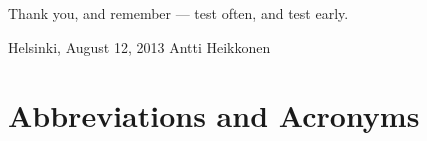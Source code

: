 \documentclass[12pt,a4paper,oneside,pdftex]{report}
\newcommand{\DATE}{August 12, 2013}
\newcommand{\AUTHOR}{Antti Heikkonen}
\begin{document}
Thank you, and remember --- test often, and test early.
\vskip 10mm

\noindent Helsinki, \DATE
\vskip 5mm
\noindent\AUTHOR

\cleardoublepage
% 

\chapter*{Abbreviations and Acronyms}


\noindent
\end{document}
